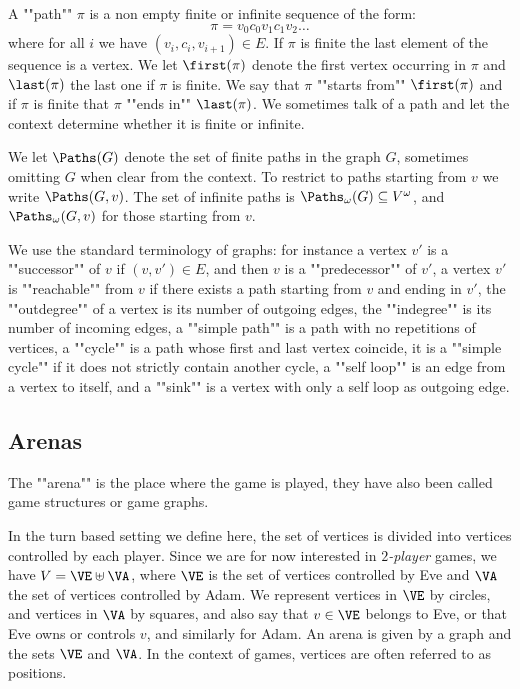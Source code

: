 A ""path"" $\pi$ is a non empty finite or infinite sequence of the form:
\[
\pi = v_0 c_0 v_1 c_1 v_2 \dots
\] 
where for all $i$ we have $(v_i,c_i, v_{i+1}) \in E$.
If $\pi$ is finite the last element of the sequence is a vertex.
We let $\first(\pi)$ denote the first vertex occurring in $\pi$ and $\last(\pi)$ the last one if $\pi$ is finite.
We say that $\pi$ ""starts from"" $\first(\pi)$ and if $\pi$ is finite that $\pi$ ""ends in"" $\last(\pi)$.
We sometimes talk of a path and let the context determine whether it is finite or infinite.

We let $\Paths(G)$ denote the set of finite paths in the graph $G$, sometimes omitting $G$ when clear from the context.
To restrict to paths starting from $v$ we write $\Paths(G,v)$.
The set of infinite paths is $\Paths_\omega(G) \subseteq V^\omega$, and $\Paths_\omega(G,v)$ for those starting from $v$.

We use the standard terminology of graphs: 
for instance 
a vertex $v'$ is a ""successor"" of $v$ if $(v,v') \in E$,
and then $v$ is a ""predecessor"" of $v'$,
a vertex $v'$ is ""reachable"" from $v$ if there exists a path starting from $v$
and ending in $v'$,
the ""outdegree"" of a vertex is its number of outgoing edges,
the ""indegree"" is its number of incoming edges,
a ""simple path"" is a path with no repetitions of vertices,
a ""cycle"" is a path whose first and last vertex coincide,
it is a ""simple cycle"" if it does not strictly contain another cycle,
a ""self loop"" is an edge from a vertex to itself,
and a ""sink"" is a vertex with only a self loop as outgoing edge.

\subsection*{Arenas}
The ""arena"" is the place where the game is played, they have also been called game structures or game graphs.

In the turn based setting we define here, the set of vertices is divided into vertices controlled by each player.
Since we are for now interested in \textit{$2$-player} games, 
we have $V = \VE \uplus \VA$, where $\VE$ is the set of vertices controlled by Eve and $\VA$ the set of vertices controlled by Adam.
We represent vertices in $\VE$ by circles, and vertices in $\VA$ by squares, and also say that $v \in \VE$
belongs to Eve, or that Eve owns or controls $v$, and similarly for Adam.
An arena is given by a graph and the sets $\VE$ and $\VA$.
In the context of games, vertices are often referred to as positions.

